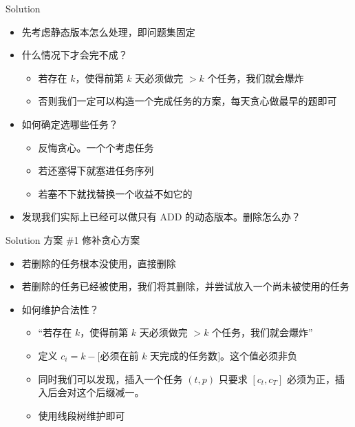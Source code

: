 ﻿\documentclass[aspectratio=169,handout]{ctexbeamer}
\begin{document}
\begin{frame}{Solution}
    \begin{itemize}
        \item 先考虑静态版本怎么处理，即问题集固定
        \item 什么情况下才会完不成？
        \pause
        \begin{itemize}
            \item 若存在 $k$，使得前第 $k$ 天必须做完 $>k$ 个任务，我们就会爆炸
            \item 否则我们一定可以构造一个完成任务的方案，每天贪心做最早的题即可
            \pause
        \end{itemize}
        \item 如何确定选哪些任务？
        \pause
        \begin{itemize}
            \item 反悔贪心。一个个考虑任务
            \item 若还塞得下就塞进任务序列
            \item 若塞不下就找替换一个收益不如它的
        \end{itemize}
        \pause
        \item 发现我们实际上已经可以做只有 ADD 的动态版本。删除怎么办？
    \end{itemize}
\end{frame}

\begin{frame}{Solution}
    方案 \#1 修补贪心方案
    \pause
    \begin{itemize}
        \item 若删除的任务根本没使用，直接删除
        \item 若删除的任务已经被使用，我们将其删除，并尝试放入一个尚未被使用的任务
        \pause
        \item 如何维护合法性？
        \begin{itemize}
            \item “若存在 $k$，使得前第 $k$ 天必须做完 $>k$ 个任务，我们就会爆炸”
            \pause
            \item 定义 $c_i=k-[$必须在前 $k$ 天完成的任务数$]$。这个值必须非负
            \item 同时我们可以发现，插入一个任务 $(t,p)$ 只要求 $[c_t,c_T]$ 必须为正，插入后会对这个后缀减一。
            \item 使用线段树维护即可 
        \end{itemize}
    \end{itemize}
\end{frame}
\end{document}
